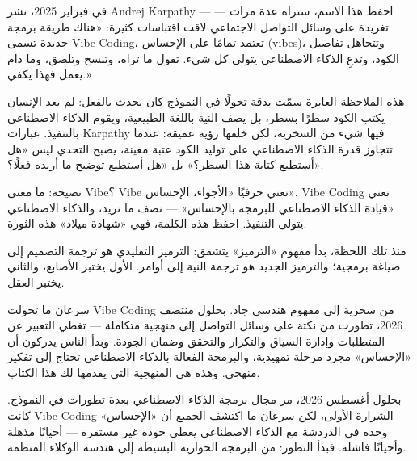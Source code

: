 


في فبراير 2025، نشر Andrej Karpathy — احفظ هذا الاسم، ستراه عدة مرات — تغريدة على وسائل التواصل الاجتماعي لاقت اقتباسات كثيرة: «هناك طريقة برمجة جديدة تسمى Vibe Coding، تعتمد تمامًا على الإحساس (vibes)، وتتجاهل تفاصيل الكود، وتدعِ الذكاء الاصطناعي يتولى كل شيء. تقول ما تراه، وتنسخ وتلصق، وما دام يعمل فهذا يكفي.»

هذه الملاحظة العابرة سمّت بدقة تحولًا في النموذج كان يحدث بالفعل: لم يعد الإنسان يكتب الكود سطرًا بسطر، بل يصف النية باللغة الطبيعية، ويقوم الذكاء الاصطناعي بالتنفيذ. عبارات Karpathy فيها شيء من السخرية، لكن خلفها رؤية عميقة: عندما تتجاوز قدرة الذكاء الاصطناعي على توليد الكود عتبة معينة، يصبح التحدي ليس «هل أستطيع كتابة هذا السطر؟» بل «هل أستطيع توضيح ما أريده فعلًا؟».

\begin{tcbinfo}{نصيحة: ما معنى Vibe؟}
Vibe تعني حرفيًا «الأجواء، الإحساس». Vibe Coding تعني «قيادة الذكاء الاصطناعي للبرمجة بالإحساس» — تصف ما تريد، والذكاء الاصطناعي يتولى التنفيذ. احفظ هذه الكلمة، فهي «شهادة ميلاد» هذه الثورة.

\end{tcbinfo}

منذ تلك اللحظة، بدأ مفهوم «الترميز» يتشقق: الترميز التقليدي هو ترجمة التصميم إلى صياغة برمجية؛ والترميز الجديد هو ترجمة النية إلى أوامر. الأول يختبر الأصابع، والثاني يختبر العقل.

سرعان ما تحولت Vibe Coding من سخرية إلى مفهوم هندسي جاد. بحلول منتصف 2026، تطورت من نكتة على وسائل التواصل إلى منهجية متكاملة — تغطي التعبير عن المتطلبات وإدارة السياق والتكرار والتحقق وضمان الجودة. وبدأ الناس يدركون أن «الإحساس» مجرد مرحلة تمهيدية، والبرمجة الفعالة بالذكاء الاصطناعي تحتاج إلى تفكير منهجي. وهذه هي المنهجية التي يقدمها لك هذا الكتاب.


بحلول أغسطس 2026، مر مجال برمجة الذكاء الاصطناعي بعدة تطورات في النموذج. كانت Vibe Coding الشرارة الأولى، لكن سرعان ما اكتشف الجميع أن «الإحساس» وحده في الدردشة مع الذكاء الاصطناعي يعطي جودة غير مستقرة — أحيانًا مذهلة وأحيانًا فاشلة. فبدأ التطور: من البرمجة الحوارية البسيطة إلى هندسة الوكلاء المنظمة.

